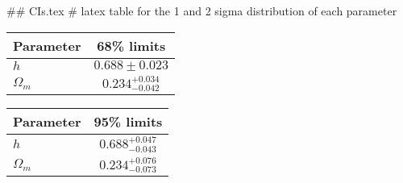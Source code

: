 ## CIs.tex
# latex table for the 1 and 2 sigma distribution of each parameter

\begin{tabular} { l  c}
 Parameter &  68\% limits\\
\hline
{\boldmath$h              $} & $0.688\pm 0.023            $\\
{\boldmath$\Omega_m       $} & $0.234^{+0.034}_{-0.042}   $\\
\hline
\end{tabular}

\begin{tabular} { l  c}
 Parameter &  95\% limits\\
\hline
{\boldmath$h              $} & $0.688^{+0.047}_{-0.043}   $\\
{\boldmath$\Omega_m       $} & $0.234^{+0.076}_{-0.073}   $\\
\hline
\end{tabular}
